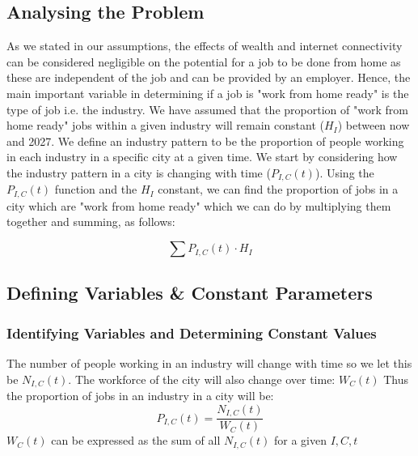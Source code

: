              
        \subsection{Analysing the Problem}  
            As we stated in our assumptions, the effects of wealth and internet connectivity can be considered negligible on the potential for a job to be done from home as these are independent of the job and can be provided by an employer. Hence, the main important variable in determining if a job is "work from home ready" is the type of job i.e. the industry.
            We have assumed that the proportion of "work from home ready" jobs within a given industry will remain constant ($H_I$) between now and 2027.
            We define an industry pattern to be the proportion of people working in each industry in a specific city at a given time. We start by considering how the industry pattern in a city is changing with time ($P_{I,C}(t)$).
            Using the $P_{I,C}(t)$ function and the $H_I$ constant, we can find the proportion of jobs in a city which are "work from home ready" which we can do by multiplying them together and summing, as follows:
            
            \begin{equation}
                    \sum P_{I,C}(t) \cdot H_I
            \end{equation}
        
        \subsection{Defining Variables \& Constant Parameters} %
            \subsubsection{Identifying Variables and Determining Constant Values}
                The number of people working in an industry will change with time so we let this be $N_{I,C}(t)$.
                The workforce of the city will also change over time: $W_C(t)$
                Thus the proportion of jobs in an industry in a city will be: 
                \begin{equation}
                P_{I,C}(t) = \frac{N_{I,C}(t)}{W_C(t)}
                \end{equation}
                $W_C(t)$ can be expressed as the sum of all $N_{I,C}(t)$ for a given $I,C,t$
                
